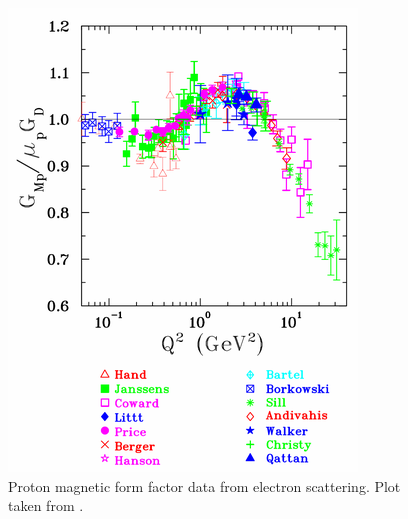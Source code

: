 \begin{figure}[ht]
\begin{minipage}{0.5\textwidth}
\includegraphics[width=0.9\linewidth]{Pictures/Gmp.png}
\caption{Proton magnetic form factor data from electron scattering. Plot taken from \cite{Perdrisat}.}
\label{fig:Gmp}
\end{minipage}

\end{figure}


